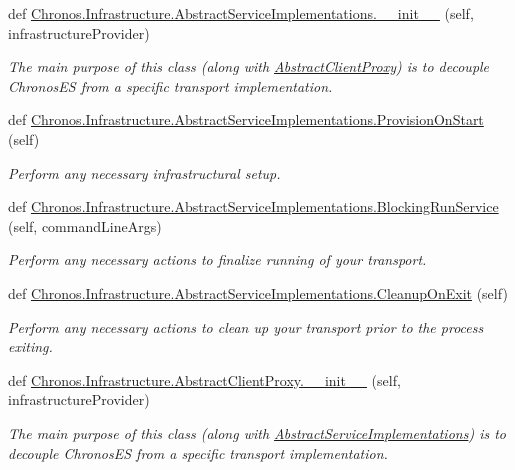\begin{DoxyCompactItemize}
\item 
def \hyperlink{group__Chronos_gaa89c796fdfbdffe469b52cf4e829bb9b}{Chronos.\+Infrastructure.\+Abstract\+Service\+Implementations.\+\_\+\+\_\+init\+\_\+\+\_\+} (self, infrastructure\+Provider)
\begin{DoxyCompactList}\small\item\em The main purpose of this class (along with \hyperlink{classChronos_1_1Infrastructure_1_1AbstractClientProxy}{Abstract\+Client\+Proxy}) is to decouple Chronos\+ES from a specific transport implementation. \end{DoxyCompactList}\item 
def \hyperlink{group__Chronos_ga18de01cae1c0b89622784731e69bc800}{Chronos.\+Infrastructure.\+Abstract\+Service\+Implementations.\+Provision\+On\+Start} (self)
\begin{DoxyCompactList}\small\item\em Perform any necessary infrastructural setup. \end{DoxyCompactList}\item 
def \hyperlink{group__Chronos_ga17d1f940e05a0994be7dcdf3584317e6}{Chronos.\+Infrastructure.\+Abstract\+Service\+Implementations.\+Blocking\+Run\+Service} (self, command\+Line\+Args)
\begin{DoxyCompactList}\small\item\em Perform any necessary actions to finalize running of your transport. \end{DoxyCompactList}\item 
def \hyperlink{group__Chronos_ga3853376d38bda7eaed7d2d703c72a7da}{Chronos.\+Infrastructure.\+Abstract\+Service\+Implementations.\+Cleanup\+On\+Exit} (self)
\begin{DoxyCompactList}\small\item\em Perform any necessary actions to clean up your transport prior to the process exiting. \end{DoxyCompactList}\item 
def \hyperlink{group__Chronos_ga6a38ae27f3142c98e72c1835ddd3a17c}{Chronos.\+Infrastructure.\+Abstract\+Client\+Proxy.\+\_\+\+\_\+init\+\_\+\+\_\+} (self, infrastructure\+Provider)
\begin{DoxyCompactList}\small\item\em The main purpose of this class (along with \hyperlink{classChronos_1_1Infrastructure_1_1AbstractServiceImplementations}{Abstract\+Service\+Implementations}) is to decouple Chronos\+ES from a specific transport implementation. \end{DoxyCompactList}\item 

\end{DoxyCompactItemize}
